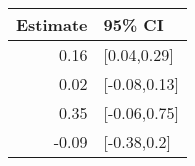\begin{tabular}{rl}
  \hline
Estimate & 95\% CI \\ 
  \hline
0.16 & [0.04,0.29] \\ 
  0.02 & [-0.08,0.13] \\ 
  0.35 & [-0.06,0.75] \\ 
  -0.09 & [-0.38,0.2] \\ 
   \hline
\end{tabular}

